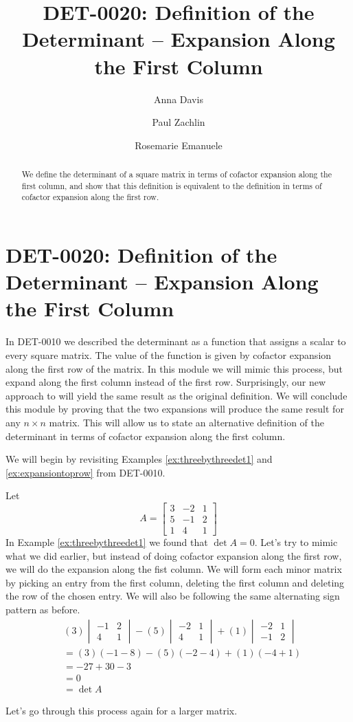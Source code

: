 \documentclass{ximera}
\author{Anna Davis \and Paul Zachlin \and Rosemarie Emanuele} \title{DET-0020: Definition of the Determinant -- Expansion Along the First Column} \license{CC-BY 4.0}
\begin{document}
\begin{abstract}
 We define the determinant of a square matrix in terms of cofactor expansion along the first column, and show that this definition is equivalent to the definition in terms of cofactor expansion along the first row.
\end{abstract}
\maketitle

\section*{DET-0020: Definition of the Determinant -- Expansion Along the First Column}
In DET-0010 we described the determinant as a function that assigns a scalar to every square matrix.  The value of the function is given by cofactor expansion along the first row of the matrix.  In this module we will mimic this process, but expand along the first column instead of the first row.  Surprisingly, our new approach to will yield the same result as the original definition.  We will conclude this module by proving that the two expansions will produce the same result for any $n\times n$ matrix. This will allow us to state an alternative definition of the determinant in terms of cofactor expansion along the first column.  


We will begin by revisiting Examples \ref{ex:threebythreedet1} and \ref{ex:expansiontoprow} from DET-0010.      

\begin{exploration}
Let 
$$A=\begin{bmatrix}3&-2&1\\5&-1&2\\1&4&1\end{bmatrix}$$
In Example \ref{ex:threebythreedet1} we found that $\det{A}=0$.  Let's try to mimic what we did earlier, but instead of doing cofactor expansion along the first row, we will do the expansion along the fist column.  We will form each minor matrix by picking an entry from the first column, deleting the first column and deleting the row of the chosen entry.  We will also be following the same alternating sign pattern as before.
\begin{align*}
&(3)\begin{vmatrix}-1&2\\4&1\end{vmatrix}-(5)\begin{vmatrix}-2&1\\4&1\end{vmatrix}+(1)\begin{vmatrix}-2&1\\-1&2\end{vmatrix}\\
&=(3)(-1-8)-(5)(-2-4)+(1)(-4+1)\\
&=-27+30-3\\
&=0\\
&=\det{A}
\end{align*}
\end{exploration}
Let's go through this process again for a larger matrix.
\end{document}
